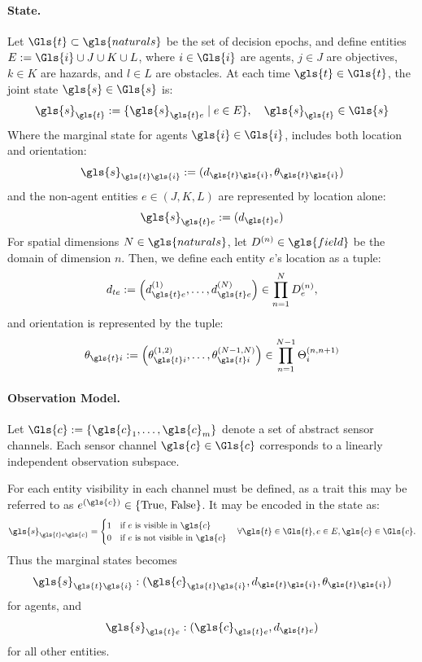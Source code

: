 \documentclass[]{jair}
\begin{document}
\paragraph{State.} 
Let \(\Gls{t} \subset \gls{naturals}\) be the set of decision epochs, 
and define entities \(E := \Gls{i}\cup J\cup K\cup L\), where 
\(i \in \Gls{i}\) are agents, 
\(j \in J\) are objectives, 
\(k \in K\) are hazards, and 
\(l \in L\) are obstacles. 
At each time \(\gls{t}\in\Gls{t}\), the joint state \(\gls{s}\in\Gls{s}\) is:
\[
    \gls{s}_{\gls{t}} := \{\gls{s}_{\gls{t}e} \mid e \in E\}, \quad \gls{s}_{\gls{t}} \in\Gls{s}
\]
Where the marginal state for agents \(\gls{i}\in\Gls{i}\), 
includes both location and orientation:
\[
    \gls{s}_{\gls{t}\gls{i}} := (d_{\gls{t}\gls{i}}, \theta_{\gls{t}\gls{i}})
\]
and the non-agent entities \(e \in (J, K, L)\) are represented by location alone:
\[
    \gls{s}_{\gls{t}e} := (d_{\gls{t}e})
\]
For spatial dimensions \(N\in\gls{naturals}\), %
let \(D^{(n)} \in\gls{field}\) be the domain of dimension \(n\).
Then, we define each entity \(e\)'s location as a tuple:
\[
    d_{te} := \left(d_{\gls{t}e}^{(1)},\ldots,d_{\gls{t}e}^{(N)}\right) 
        \in \prod_{n=1}^N D_e^{(n)},
\]
and orientation is represented by the tuple:
\[
    \theta_{\gls{t}i} := \left(\theta_{\gls{t}i}^{(1,2)},\ldots,
        \theta_{\gls{t}i}^{(N-1,N)}\right) \in \prod_{n=1}^{N-1} \Theta_i^{(n,n+1)}
\]

\paragraph{Observation Model.}
Let \(\Gls{c} := \{\gls{c}_1, \ldots, \gls{c}_m\}\) %
denote a set of abstract sensor channels. Each sensor channel 
\(\gls{c} \in \Gls{c}\) %
corresponds to a linearly independent observation subspace.

For each entity visibility in each channel must be defined,
as a trait this may be referred to as \(e^{(\gls{c})} \in \{\text{True, False}\}\).
It may be encoded in the state as:
\[
    \gls{s}_{\gls{t}e\gls{c}} = %
    \begin{cases}
        1& \text{if \(e\) is visible in \(\gls{c}\)} \\ 
        0& \text{if \(e\) is not visible in \(\gls{c}\)}
    \end{cases} 
    \quad\forall \gls{t}\in\Gls{t}, e\in E, \gls{c}\in\Gls{c}.
\]
Thus the marginal states becomes
\[\gls{s}_{\gls{t}\gls{i}} :(\gls{c}_{\gls{t}\gls{i}},d_{\gls{t}\gls{i}},\theta_{\gls{t}\gls{i}})\]
for agents, and
\[\gls{s}_{\gls{t}e} :(\gls{c}_{\gls{t}e},d_{\gls{t}e})\]
for all other entities.
\end{document}
